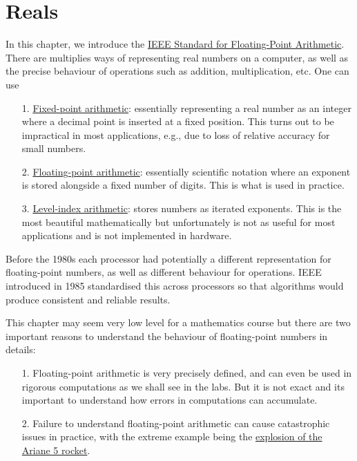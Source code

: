 
\section{Reals}
In this chapter, we introduce  the  \href{https://en.wikipedia.org/wiki/IEEE_754}{IEEE Standard for Floating-Point Arithmetic}. There are multiplies ways of representing real numbers on a computer, as well as  the precise behaviour of operations such as addition, multiplication, etc. One can use

\begin{itemize}
\item[1. ] \href{https://en.wikipedia.org/wiki/Fixed-point_arithmetic}{Fixed-point arithmetic}: essentially representing a real number as an integer where a decimal point is inserted at a fixed position. This turns out to be impractical in most applications, e.g., due to loss of relative accuracy for small numbers.


\item[2. ] \href{https://en.wikipedia.org/wiki/Floating-point_arithmetic}{Floating-point arithmetic}: essentially scientific notation where an exponent is stored alongside a fixed number of digits. This is what is used in practice.


\item[3. ] \href{https://en.wikipedia.org/wiki/Symmetric_level-index_arithmetic}{Level-index arithmetic}: stores numbers as iterated exponents. This is the most beautiful mathematically but unfortunately is not as useful for most applications and is not implemented in hardware.

\end{itemize}
Before the 1980s each processor had potentially a different representation for  floating-point numbers, as well as different behaviour for operations.  IEEE introduced in 1985  standardised this across processors so that algorithms would produce consistent and reliable results.

This chapter may seem very low level for a mathematics course but there are two important reasons to understand the behaviour of floating-point numbers in details:

\begin{itemize}
\item[1. ] Floating-point arithmetic is very precisely defined, and can even be used in rigorous computations as we shall see in the labs. But it is not exact and its important to understand how errors in computations can accumulate.


\item[2. ] Failure to understand floating-point arithmetic can cause catastrophic issues in practice, with the extreme example being the  \href{https://youtu.be/N6PWATvLQCY?t=86}{explosion of the Ariane 5 rocket}.

\end{itemize}
